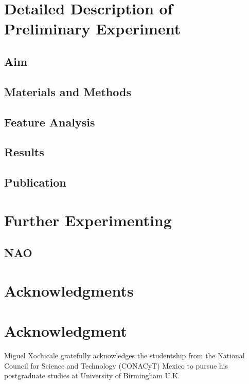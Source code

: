 \documentclass[12pt,journal,onecolumn,compsoc]{IEEEtran}
\begin{document}
\section{Detailed Description of Preliminary Experiment}

\subsection{Aim}

\subsection{Materials and Methods}

\subsection{Feature Analysis}

\subsection{Results}

\subsection{Publication}




\section{Further Experimenting}


\subsection{NAO}



\ifCLASSOPTIONcompsoc
  \section*{Acknowledgments}
\else
  \section*{Acknowledgment}
\fi

Miguel Xochicale gratefully acknowledges the studentship from 
the National Council for Science and Technology (CONACyT) Mexico
to pursue his postgraduate studies at University of Birmingham U.K.
\end{document}
